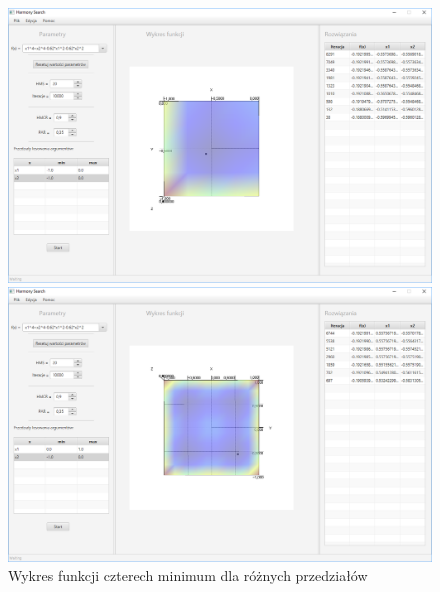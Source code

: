 \documentclass[10pt, a4paper]{article}
\begin{document}
\begin{figure}[htbp]
\begin{minipage}[b]{.5\textwidth}
		\caption{$x_{1}\in<0,1>,  x_{2}\in<0,1>$}
	\end{minipage} 
	\newline \newline
	\begin{minipage}[b]{.5\textwidth}
		\centering
		\includegraphics[width=\linewidth]{images/14.PNG}
		\caption{$x_{1}\in<-1,0>,  x_{2}\in<-1,0>$}
	\end{minipage}
	\begin{minipage}[b]{.5\textwidth}
		\centering
		\includegraphics[width=\linewidth]{images/17.PNG} 
		\caption{$x_{1}\in<0,1>,  x_{2}\in<-1,0>$}
	\end{minipage}
	\label{fig:12}
	\caption{Wykres funkcji czterech minimum dla różnych przedziałów}
\end{figure}
 
\end{document}
